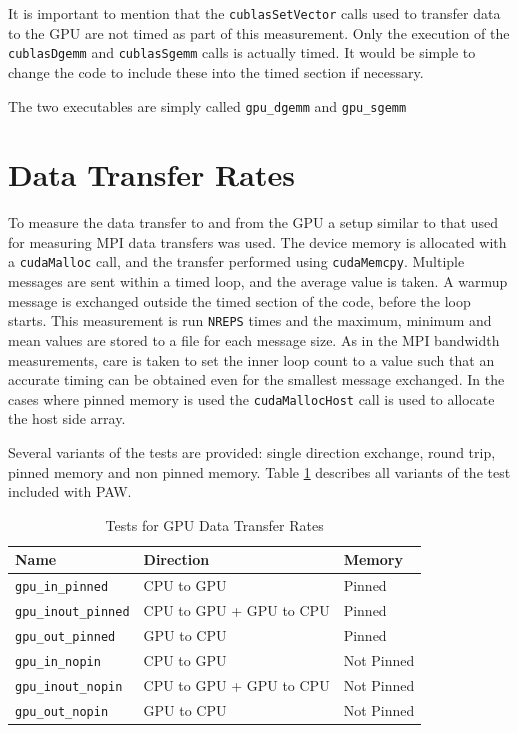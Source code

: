 \documentclass[10pt,a4paper]{report}
\begin{document}
It is important to mention that the \verb+cublasSetVector+ calls used to transfer data to the GPU are not timed as part of this measurement. Only the execution of the \verb+cublasDgemm+ and \verb+cublasSgemm+ calls is actually timed. It would be simple to change the code to include these into the timed section if necessary.

The two executables are simply called \verb+gpu_dgemm+ and \verb+gpu_sgemm+


\section{Data Transfer Rates}
\label{sec:gpu_bw}
To measure the data transfer to and from the GPU a setup similar to that used for measuring MPI data transfers was used. The device memory is allocated with a \verb+cudaMalloc+ call, and the transfer performed using \verb+cudaMemcpy+. Multiple messages are sent within a timed loop, and the average value is taken. A warmup message is exchanged outside the timed section of the code, before the loop starts. This measurement is run \verb+NREPS+ times and the maximum, minimum and mean values are stored to a file for each message size. As in the MPI bandwidth measurements, care is taken to set the inner loop count to a value such that an accurate timing can be obtained even for the smallest message exchanged. In the cases where pinned memory is used the \verb+cudaMallocHost+ call is used to allocate the host side array.

Several variants of the tests are provided: single direction exchange, round trip, pinned memory and non pinned memory. Table \ref{tab:gpu_bw} describes all variants of the test included with PAW.

\begin{table}[ht]
\centering
\caption{Tests for GPU Data Transfer Rates}
\label{tab:gpu_bw}
\begin{tabular}{|l|l|l|}
\hline
\bf{Name}	                & \bf{Direction}          & \bf{Memory}\\\hline
\texttt{gpu\_in\_pinned}    & CPU to GPU              & Pinned\\
\texttt{gpu\_inout\_pinned} & CPU to GPU + GPU to CPU & Pinned\\
\texttt{gpu\_out\_pinned}   & GPU to CPU              & Pinned\\
\texttt{gpu\_in\_nopin}     & CPU to GPU              & Not Pinned\\
\texttt{gpu\_inout\_nopin}  & CPU to GPU + GPU to CPU & Not Pinned\\
\texttt{gpu\_out\_nopin}    & GPU to CPU              & Not Pinned\\
\hline
\end{tabular}
\end{table}
\end{document}
